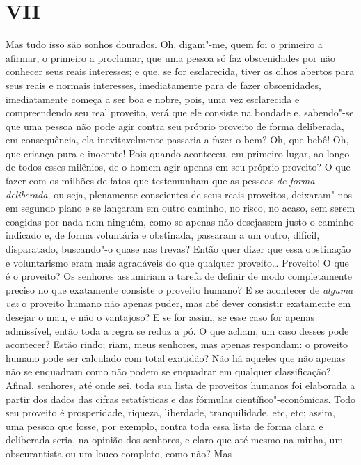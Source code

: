 \section{VII}

Mas tudo isso são sonhos dourados. Oh, digam"-me, quem foi o primeiro a
afirmar, o primeiro a proclamar, que uma pessoa só faz obscenidades por
não conhecer seus reais interesses; e que, se for esclarecida, tiver os
olhos abertos para seus reais e normais interesses, imediatamente para
de fazer obscenidades, imediatamente começa a ser boa e nobre, pois, uma
vez esclarecida e compreendendo seu real proveito, verá que ele consiste
na bondade e, sabendo"-se que uma pessoa não pode agir contra seu próprio
proveito de forma deliberada, em consequência, ela inevitavelmente
passaria a fazer o bem? Oh, que bebê! Oh, que criança pura e inocente!
Pois quando aconteceu, em primeiro lugar, ao longo de todos esses
milênios, de o homem agir apenas em seu próprio proveito? O que fazer
com os milhões de fatos que testemunham que as pessoas \emph{de forma
deliberada,} ou seja, plenamente conscientes de seus reais proveitos,
deixaram"-nos em segundo plano e se lançaram em outro caminho, no risco,
no acaso, sem serem coagidas por nada nem ninguém, como se apenas não
desejassem justo o caminho indicado e, de forma voluntária e obstinada,
passaram a um outro, difícil, disparatado, buscando"-o quase nas trevas?
Então quer dizer que essa obstinação e voluntarismo eram mais agradáveis
do que qualquer proveito\ldots{} Proveito! O que é o proveito? Os senhores
assumiriam a tarefa de definir de modo completamente preciso no que
exatamente consiste o proveito humano? E se acontecer de \emph{alguma
vez} o proveito humano não apenas puder, mas até dever consistir
exatamente em desejar o mau, e não o vantajoso? E se for assim, se esse
caso for apenas admissível, então toda a regra se reduz a pó. O que
acham, um caso desses pode acontecer? Estão rindo; riam, meus senhores,
mas apenas respondam: o proveito humano pode ser calculado com total
exatidão? Não há aqueles que não apenas não se enquadram como não podem
se enquadrar em qualquer classificação? Afinal, senhores, até onde sei,
toda sua lista de proveitos humanos foi elaborada a partir dos dados das
cifras estatísticas e das fórmulas científico"-econômicas. Todo seu
proveito é prosperidade, riqueza, liberdade, tranquilidade, etc, etc;
assim, uma pessoa que fosse, por exemplo, contra toda essa lista de
forma clara e deliberada seria, na opinião dos senhores, e claro que até
mesmo na minha, um obscurantista ou um louco completo, como não? Mas

